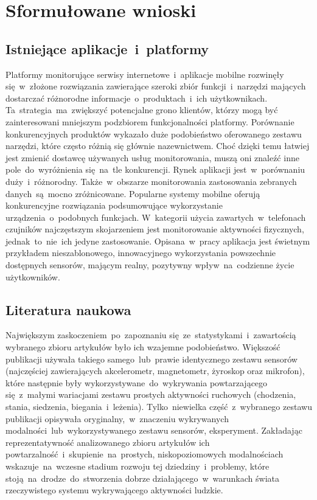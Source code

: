 \section{Sformułowane wnioski}

\subsection{Istniejące aplikacje~i~platformy}
Platformy monitorujące serwisy internetowe~i~aplikacje mobilne rozwinęły się~w~złożone rozwiązania zawierające szeroki zbiór funkcji~i~narzędzi mających dostarczać różnorodne informacje~o~produktach~i~ich użytkownikach. Ta~strategia~ma~zwiększyć potencjalne grono klientów, którzy mogą być zainteresowani mniejszym podzbiorem funkcjonalności platformy. Porównanie konkurencyjnych produktów wykazało duże podobieństwo oferowanego zestawu narzędzi, które często różnią się głównie nazewnictwem. Choć dzięki temu łatwiej jest zmienić dostawcę używanych usług monitorowania, muszą oni znaleźć inne pole~do~wyróżnienia się~na~tle konkurencji. Rynek aplikacji jest~w~porównaniu duży~i~różnorodny. Także~w~obszarze monitorowania zastosowania zebranych danych~są~mocno zróżnicowane. Popularne systemy mobilne oferują konkurencyjne rozwiązania podsumowujące wykorzystanie urządzenia~o~podobnych funkcjach. W~kategorii użycia zawartych~w~telefonach czujników najczęstszym skojarzeniem jest monitorowanie aktywności fizycznych, jednak~to~nie~ich jedyne zastosowanie. Opisana~w~pracy aplikacja  jest świetnym przykładem nieszablonowego, innowacyjnego wykorzystania powszechnie dostępnych sensorów, mającym realny, pozytywny wpływ~na~codzienne życie użytkowników.

\subsection{Literatura naukowa}
Największym zaskoczeniem~po~zapoznaniu się~ze~statystykami~i~zawartością wybranego zbioru artykułów było ich wzajemne podobieństwo. Większość publikacji używała takiego samego~lub~prawie identycznego zestawu sensorów (najczęściej zawierających akcelerometr, magnetometr, żyroskop oraz mikrofon), które następnie były wykorzystywane~do~wykrywania powtarzającego się~z~małymi wariacjami zestawu prostych aktywności ruchowych (chodzenia, stania, siedzenia, biegania~i~leżenia). Tylko~niewielka część~z~wybranego zestawu publikacji opisywała oryginalny,~w~znaczeniu wykrywanych modalności~lub~wykorzystywanego zestawu sensorów, eksperyment. Zakładając reprezentatywność analizowanego zbioru artykułów ich powtarzalność~i~skupienie~na~prostych, niskopoziomowych modalnościach wskazuje~na~wczesne stadium rozwoju tej dziedziny~i~problemy, które stoją~na~drodze~do~stworzenia dobrze działającego~w~warunkach świata rzeczywistego systemu wykrywającego aktywności ludzkie.

